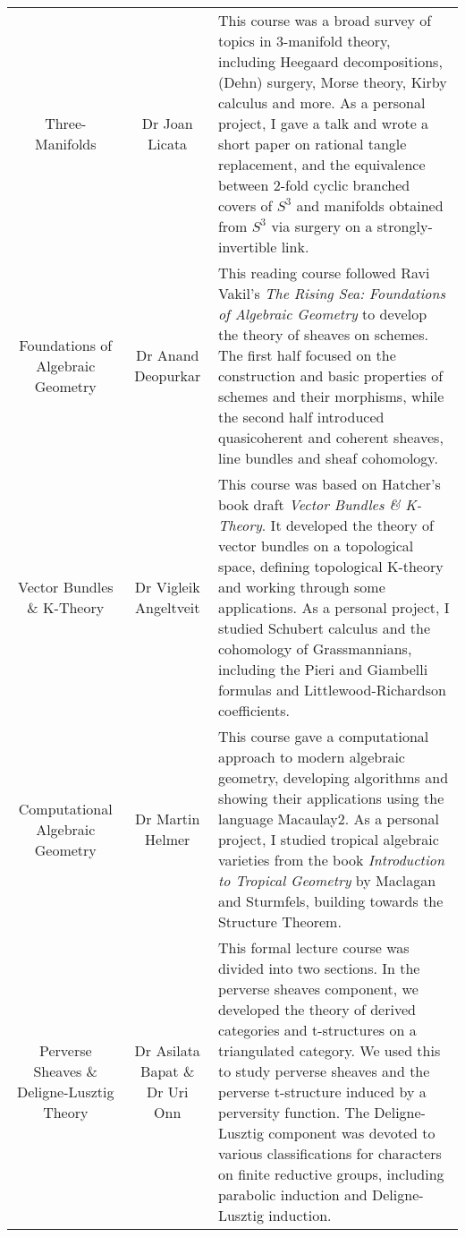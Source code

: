 \documentclass[a4paper,10pt]{article} %
\begin{document}
\begin{tabulary}{\textwidth}{ C  C  L }
Three-Manifolds & Dr Joan Licata & \footnotesize This course was a broad survey of topics in 3-manifold theory, including Heegaard decompositions, (Dehn) surgery, Morse theory, Kirby calculus and more. As a personal project, I gave a talk and wrote a short paper on rational tangle replacement, and the equivalence between 2-fold cyclic branched covers of $S^3$ and manifolds obtained from $S^3$ via surgery on a strongly-invertible link. \normalsize\\

Foundations of Algebraic Geometry & Dr Anand Deopurkar & \footnotesize This reading course followed Ravi Vakil’s \emph{The Rising Sea: Foundations of Algebraic Geometry} to develop the theory of sheaves on schemes. The first half focused on the construction and basic properties of schemes and their morphisms, while the second half introduced quasicoherent and coherent sheaves, line bundles and sheaf cohomology. \normalsize\\

Vector Bundles \& K-Theory & Dr Vigleik Angeltveit & \footnotesize This course was based on Hatcher's book draft \emph{Vector Bundles \& K-Theory}. It developed the theory of vector bundles on a topological space, defining topological K-theory and working through some applications. As a personal project, I studied Schubert calculus and the cohomology of Grassmannians, including the Pieri and Giambelli formulas and Littlewood-Richardson coefficients. \normalsize\\

Computational Algebraic Geometry & Dr Martin Helmer & \footnotesize This course gave a computational approach to modern algebraic geometry, developing algorithms and showing their applications using the language Macaulay2. As a personal project, I studied tropical algebraic varieties from the book \emph{Introduction to Tropical Geometry} by Maclagan and Sturmfels, building towards the Structure Theorem.\normalsize\\

Perverse Sheaves \& Deligne-Lusztig Theory & Dr Asilata Bapat \& Dr Uri Onn & \footnotesize This formal lecture course was divided into two sections. In the perverse sheaves component, we developed the theory of derived categories and t-structures on a triangulated category. We used this to study perverse sheaves and the perverse t-structure induced by a perversity function. The Deligne-Lusztig component was devoted to various classifications for characters on finite reductive groups, including parabolic induction and Deligne-Lusztig induction. \normalsize\\


\end{tabulary}
\end{document}
